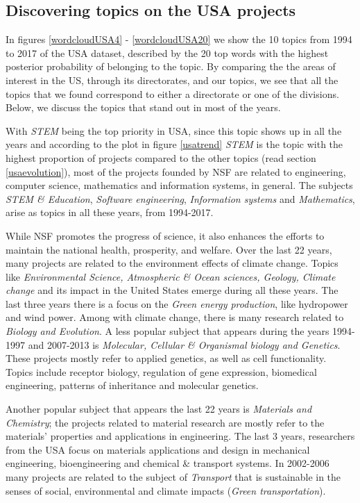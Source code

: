 \documentclass[12pt]{report}
\begin{document}
\vfill
\subsection{Discovering topics on the USA projects}

In figures \ref{wordcloudUSA4} - \ref{wordcloudUSA20} we show the 10 topics 
from 1994 to 2017 of the USA dataset, described by
the 20 top words with the highest posterior probability of belonging
to the topic.
By comparing the the areas of interest in the US, through its directorates, 
and our topics, we see that all the topics that we found correspond to either 
a directorate or one of the divisions. Below, we discuss the topics that
stand out in most of the years.

With \emph{STEM} being the top priority in USA, since this topic shows up in all the years
and according to the plot in figure \ref{usatrend} \emph{STEM} is the topic with the highest proportion
of projects compared to the other topics (read section \ref{usaevolution}), 
most of the projects founded by
NSF are related to engineering, computer science, mathematics and
information systems, in general. The subjects \emph{STEM \& Education},
\emph{Software engineering}, \emph{Information systems} and \emph{Mathematics}, arise as
topics in all these years, from 1994-2017.

While NSF promotes the progress of science, it also enhances the efforts to
maintain the national health, prosperity, and welfare. Over the last 22 years,
many projects are related to the environment effects of climate change. Topics
like \emph{Environmental Science, Atmospheric \& Ocean sciences, Geology, Climate
change} and its impact in the United States emerge during all these years. The
last three years there is a focus on the \emph{Green energy production}, like
hydropower and wind power. Among with climate change, there is many research
related to \emph{Biology and Evolution}. A less popular subject that appears during the
years 1994-1997 and 2007-2013 is \emph{Molecular, Cellular \& Organismal biology and
Genetics}. These projects mostly refer to applied genetics, as well as cell
functionality. Topics include receptor biology, regulation of gene expression,
biomedical engineering, patterns of inheritance and molecular genetics.

Another popular subject that appears the last 22 years is \emph{Materials and
Chemistry}; the projects related to material research are mostly refer to the
materials' properties and applications in engineering. The last 3 years,
researchers from the USA focus on materials applications and design in
mechanical engineering, bioengineering and chemical \& transport systems. In
2002-2006 many projects are related to the subject of \emph{Transport} that is
sustainable in the senses of social, environmental and climate impacts (\emph{Green
transportation}).
\end{document}
